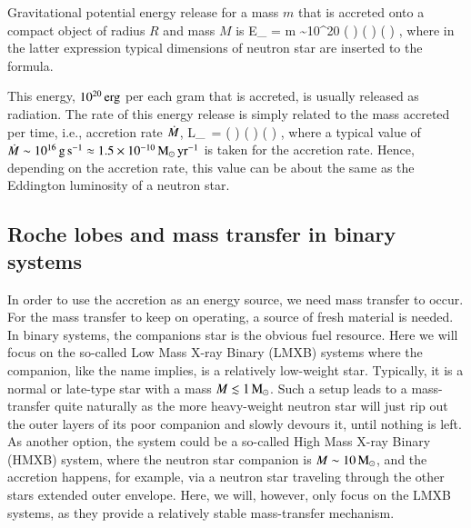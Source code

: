 Gravitational potential energy release for a mass $m$ that is accreted onto a compact object of radius $R$ and mass $M$ is
\be
\Delta E_{} = m  \sim 10^{20} \left(  \right) \left(  \right) \left(  \right) \erg,
\ee
where in the latter expression typical dimensions of neutron star are inserted to the formula.

This energy, $10^{20} \, \mathrm{erg}$ per each gram that is accreted, is usually released as radiation.
The rate of this energy release is simply related to the mass accreted per time, i.e., accretion rate $\dot{M}$, 
\be
L_{} = \Mdot {} \approx {} \left(  \right) \left(  \right) \left(  \right) \ergs,
\ee
where a typical value of $\dot{M} \sim 10^{16} \, \mathrm{g}\,\mathrm{s}^{-1} \approx 1.5 \times 10^{-10} \, \mathrm{M}_{\odot}\,\mathrm{yr}^{-1}$ is taken for the accretion rate.
Hence, depending on the accretion rate, this value can be about the same as the Eddington luminosity  of a neutron star.



\subsection{Roche lobes and mass transfer in binary systems}

In order to use the accretion as an energy source, we need mass transfer to occur.
For the mass transfer to keep on operating, a source of fresh material is needed.
In binary systems, the companions star is the obvious fuel resource.
Here we will focus on the so-called Low Mass X-ray Binary (LMXB) systems where the companion, like the name implies, is a relatively low-weight star.\cite{TH06}
Typically, it is a normal or late-type star with a mass $M \lesssim 1 \, \mathrm{M}_{\odot}$.
Such a setup leads to a mass-transfer quite naturally as the more heavy-weight neutron star will just rip out the outer layers of its poor companion and slowly devours it, until nothing is left.
As another option, the system could be a so-called High Mass X-ray Binary (HMXB) system, where the neutron star companion is $M \sim 10\, \mathrm{M}_{\odot}$, and the accretion happens, for example, via a neutron star traveling through the other stars extended outer envelope.
Here, we will, however, only focus on the LMXB systems, as they provide a relatively stable mass-transfer mechanism.


